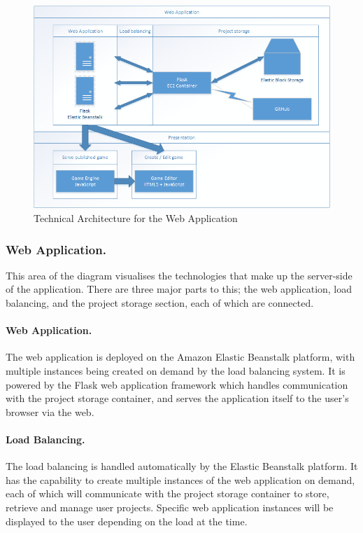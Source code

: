 \documentclass[a4paper, 12pt]{article}
\begin{document}
\begin{figure}[h]
	\centering
	\includegraphics[scale=0.72]{architecture}
	\caption{Technical Architecture for the Web Application}
	\label{fig:architecture}
\end{figure}

\subsubsection{Web Application.}
This area of the diagram visualises the technologies that make up the server-side of the application. There are three major parts to this; the web application, load balancing, and the project storage section, each of which are connected.

\paragraph{Web Application.}
The web application is deployed on the Amazon Elastic Beanstalk platform, with multiple instances being created on demand by the load balancing system. It is powered by the Flask web application framework which handles communication with the project storage container, and serves the application itself to the user's browser via the web.

\paragraph{Load Balancing.}
The load balancing is handled automatically by the Elastic Beanstalk platform. It has the capability to create multiple instances of the web application on demand, each of which will communicate with the project storage container to store, retrieve and manage user projects. Specific web application instances will be displayed to the user depending on the load at the time.
\end{document}
